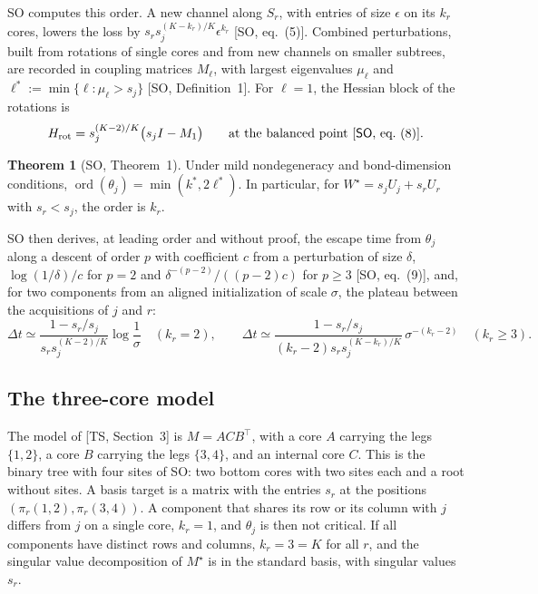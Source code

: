 \documentclass[11pt]{article}
\newcommand{\ord}{\operatorname{ord}}
\newcommand{\TS}{\textsf{TS}}
\newcommand{\SO}{\textsf{SO}}
\newcommand{\ts}[1]{[\TS, #1]}
\newcommand{\so}[1]{[\SO, #1]}
\theoremstyle{definition}
\newtheorem{theorem}{Theorem}[section]
\numberwithin{equation}{section}
\begin{document}
\SO{} computes this order. A new channel along $S_r$, with entries of size $\epsilon$ on its $k_r$ cores, lowers the loss by $s_rs_j^{(K-k_r)/K}\epsilon^{k_r}$ \so{eq.~(5)}. Combined perturbations, built from rotations of single cores and from new channels on smaller subtrees, are recorded in coupling matrices $M_\ell$, with largest eigenvalues $\mu_\ell$ and $\ell^*:=\min\{\ell:\mu_\ell>s_j\}$ \so{Definition~1}. For $\ell=1$, the Hessian block of the rotations is
\begin{equation}\label{eq:Hrot}
H_{\rm rot}=s_j^{(K-2)/K}\big(s_jI-M_1\big)\qquad\text{at the balanced point \so{eq.~(8)}}.
\end{equation}
\begin{theorem}[\SO, Theorem~1]\label{thm:so}
Under mild nondegeneracy and bond-dimension conditions, $\ord(\theta_j)=\min(k^*,2\ell^*)$. In particular, for $W^\star=s_jU_j+s_rU_r$ with $s_r<s_j$, the order is $k_r$.
\end{theorem}
\SO{} then derives, at leading order and without proof, the escape time from $\theta_j$ along a descent of order $p$ with coefficient $c$ from a perturbation of size $\delta$, $\log(1/\delta)/c$ for $p=2$ and $\delta^{-(p-2)}/((p-2)c)$ for $p\ge3$ \so{eq.~(9)}, and, for two components from an aligned initialization of scale $\sigma$, the plateau between the acquisitions of $j$ and $r$:
\begin{equation}\label{eq:so10}
\Delta t\simeq\frac{1-s_r/s_j}{s_rs_j^{(K-2)/K}}\log\frac1\sigma\quad(k_r=2),\qquad\Delta t\simeq\frac{1-s_r/s_j}{(k_r-2)s_rs_j^{(K-k_r)/K}}\,\sigma^{-(k_r-2)}\quad(k_r\ge3).
\end{equation}

\subsection{The three-core model}\label{sec:three-core}

The model of \ts{Section~3} is $M=ACB^\top$, with a core $A$ carrying the legs $\{1,2\}$, a core $B$ carrying the legs $\{3,4\}$, and an internal core $C$. This is the binary tree with four sites of \SO: two bottom cores with two sites each and a root without sites. A basis target is a matrix with the entries $s_r$ at the positions $(\pi_r(1,2),\pi_r(3,4))$. A component that shares its row or its column with $j$ differs from $j$ on a single core, $k_r=1$, and $\theta_j$ is then not critical. If all components have distinct rows and columns, $k_r=3=K$ for all $r$, and the singular value decomposition of $M^\star$ is in the standard basis, with singular values $s_r$.
\end{document}
